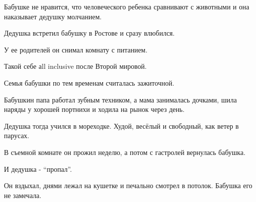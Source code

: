 Бабушке не нравится, что человеческого  ребенка сравнивают с животными и она
наказывает дедушку молчанием. 

Дедушка встретил бабушку в Ростове  и сразу влюбился. 

У ее родителей он снимал комнату с питанием. 

Такой  себе аll inclusive после Второй мировой.

Семья бабушки   по тем временам считалась  зажиточной. 

Бабушкин папа работал зубным техником, а  мама занималась дочками, шила наряды
у хорошей портнихи и ходила на рынок через день. 

Дедушка тогда учился в мореходке. Худой, весёлый и свободный, как ветер в
парусах. 

В съемной комнате он прожил неделю, а потом с гастролей вернулась бабушка. 

И дедушка -  \enquote{пропал}.

Он вздыхал, днями лежал на кушетке и печально смотрел в потолок. Бабушка его
не замечала.
